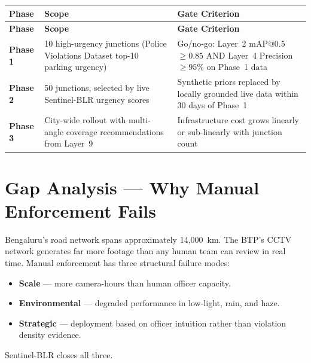 \documentclass[11pt,a4paper]{article}
\begin{document}
\begin{longtable}{L{2cm} L{5.5cm} L{7cm}}
    \toprule
    \color{white}\textbf{Phase} & \color{white}\textbf{Scope} & \color{white}\textbf{Gate Criterion} \\
    \midrule
    \endfirsthead
    \toprule
    \color{white}\textbf{Phase} & \color{white}\textbf{Scope} & \color{white}\textbf{Gate Criterion} \\
    \midrule
    \endhead
    \bottomrule
    \endfoot

    \textbf{Phase 1} & 10 high-urgency junctions (Police Violations Dataset top-10 parking urgency) & Go/no-go: Layer~2 mAP@0.5 $\geq 0.85$ AND Layer~4 Precision $\geq 95\%$ on Phase~1 data \\
    \textbf{Phase 2} & 50 junctions, selected by live Sentinel-BLR urgency scores & Synthetic priors replaced by locally grounded live data within 30 days of Phase~1 \\
    \textbf{Phase 3} & City-wide rollout with multi-angle coverage recommendations from Layer~9 & Infrastructure cost grows linearly or sub-linearly with junction count \\
\end{longtable}

\section{Gap Analysis — Why Manual Enforcement Fails}

Bengaluru's road network spans approximately 14,000~km. The BTP's CCTV network generates far more footage than any human team can review in real time. Manual enforcement has three structural failure modes:

\begin{itemize}[leftmargin=1.8em, itemsep=0.2em]
    \item \textbf{Scale} — more camera-hours than human officer capacity.
    \item \textbf{Environmental} — degraded performance in low-light, rain, and haze.
    \item \textbf{Strategic} — deployment based on officer intuition rather than violation density evidence.
\end{itemize}

Sentinel-BLR closes all three.
\end{document}
